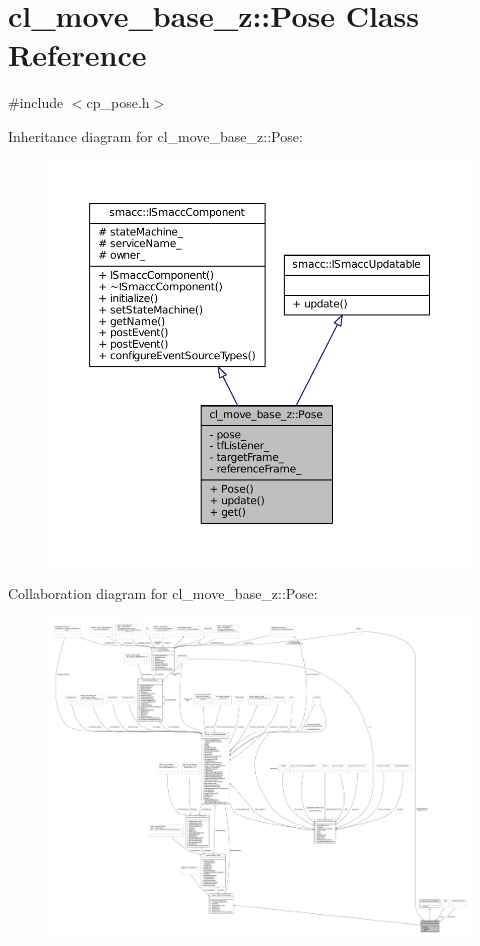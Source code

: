 \hypertarget{classcl__move__base__z_1_1Pose}{}\section{cl\+\_\+move\+\_\+base\+\_\+z\+:\+:Pose Class Reference}
\label{classcl__move__base__z_1_1Pose}


{\ttfamily \#include $<$cp\+\_\+pose.\+h$>$}



Inheritance diagram for cl\+\_\+move\+\_\+base\+\_\+z\+:\+:Pose\+:
\nopagebreak
\begin{figure}[H]
\begin{center}
\leavevmode
\includegraphics[width=350pt]{classcl__move__base__z_1_1Pose__inherit__graph}
\end{center}
\end{figure}


Collaboration diagram for cl\+\_\+move\+\_\+base\+\_\+z\+:\+:Pose\+:
\nopagebreak
\begin{figure}[H]
\begin{center}
\leavevmode
\includegraphics[width=350pt]{classcl__move__base__z_1_1Pose__coll__graph}
\end{center}
\end{figure}
